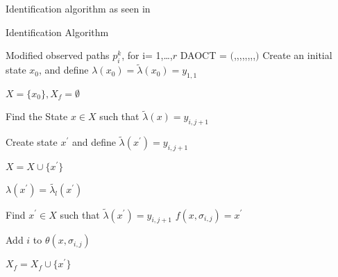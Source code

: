 Identification algorithm as seen in \cite{moreira2018enhanced}
\begin{algorithm2e}
  \caption{Identification Algorithm}\label{alg:identification}
\KwIn
{%
Modified observed paths $p_i^k$, for i= 1,\dots,$r$
}
\KwOut
{%
DAOCT = $($\XSet,\SigmaSet,\OmegaSet,\ffunction,\lambdafunction,\RSet,\thetafunction,\xZero,\XfSet$)$
}
\BlankLine
Create an initial state $x_0$, and define $\lambda(x_0) = \tilde{\lambda}(x_0) =
y_{1,1}$

$X = \{ x_0\}, X_f = \emptyset$

{
{
  Find the State $x \in X $ such that $\tilde{\lambda}(x) = y_{i,j+1}$

  { Create state $x^\prime$ and define $\tilde{\lambda}(x^\prime) = y_{i,j+1}$

$X = X \cup \{ x^\prime\}$

$\lambda(x^\prime) = \tilde{\lambda_l}(x^\prime)$

}
{
  Find $x^\prime \in X$ such that $\tilde{\lambda}(x^\prime) = y_{i,j+1}$
}
$f(x,\sigma_{i,j}) = x^\prime$

Add $i$ to $\theta(x,\sigma_{i,j})$

{
  $X_f = X_f \cup \{x^\prime\}$
}
}
}
\end{algorithm2e}


%   

%   

